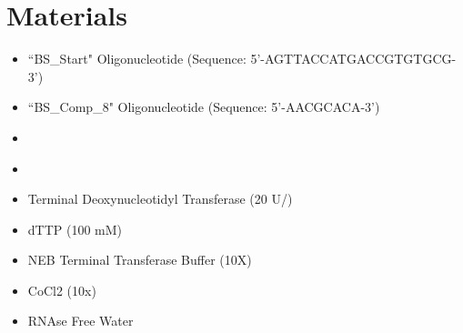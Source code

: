 \documentclass{ssiBio}
\begin{document}
\section{Materials}
\begin{itemize}

\item{``BS\_Start" Oligonucleotide (Sequence:  5'-AGTTACCATGACCGTGTGCG-3')}


\item{``BS\_Comp\_8" Oligonucleotide (Sequence:  5'-AACGCACA-3')}
\item{ }
\item{ }
\item{Terminal Deoxynucleotidyl Transferase (20 U/\uL{})}
\item{dTTP (100 mM)}
\item{NEB Terminal Transferase Buffer (10X)}
\item{CoCl2 (10x)}
\item{RNAse Free Water}
\end{itemize}
\end{document}
